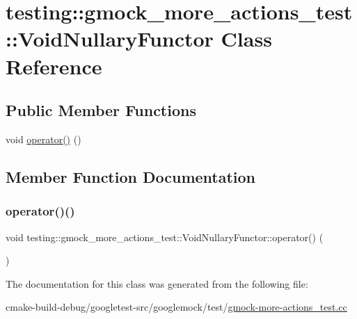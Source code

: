 \hypertarget{classtesting_1_1gmock__more__actions__test_1_1VoidNullaryFunctor}{}\section{testing\+::gmock\+\_\+more\+\_\+actions\+\_\+test\+::Void\+Nullary\+Functor Class Reference}
\label{classtesting_1_1gmock__more__actions__test_1_1VoidNullaryFunctor}
\subsection*{Public Member Functions}
\begin{DoxyCompactItemize}
\item 
void \mbox{\hyperlink{classtesting_1_1gmock__more__actions__test_1_1VoidNullaryFunctor_a3b71273472780abc47927c57af209204}{operator()}} ()
\end{DoxyCompactItemize}


\subsection{Member Function Documentation}
\mbox{\label{classtesting_1_1gmock__more__actions__test_1_1VoidNullaryFunctor_a3b71273472780abc47927c57af209204}} 
\subsubsection{\texorpdfstring{operator()()}{operator()()}}
{\footnotesize\ttfamily void testing\+::gmock\+\_\+more\+\_\+actions\+\_\+test\+::\+Void\+Nullary\+Functor\+::operator() (\begin{DoxyParamCaption}{ }\end{DoxyParamCaption})\hspace{0.3cm}{\ttfamily [inline]}}



The documentation for this class was generated from the following file\+:\begin{DoxyCompactItemize}
\item 
cmake-\/build-\/debug/googletest-\/src/googlemock/test/\mbox{\hyperlink{gmock-more-actions__test_8cc}{gmock-\/more-\/actions\+\_\+test.\+cc}}\end{DoxyCompactItemize}
